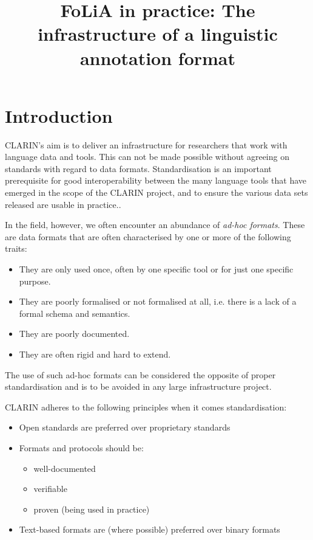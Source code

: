 \documentclass[a4paper,10pt,twoside]{article}
\begin{document}
\title{FoLiA in practice: The infrastructure of a linguistic annotation format}

\section{Introduction}

CLARIN's aim is to deliver an infrastructure for researchers that work with
language data and tools. This can not be made possible without agreeing on standards
with regard to data formats. Standardisation is an important prerequisite for
good interoperability between the many language tools that have emerged in the scope
of the CLARIN project, and to ensure the various data sets released are usable
in practice..

In the field, however, we often encounter an abundance of \emph{ad-hoc formats}. These are
data formats that are often characterised by one or more of the following traits:

\begin{itemize}
    \item They are only used once, often by one specific tool or for just one specific purpose.
    \item They are poorly formalised or not formalised at all, i.e. there is a lack of a formal schema and semantics.
    \item They are poorly documented.
    \item They are often rigid and hard to extend.
\end{itemize}

The use of such ad-hoc formats can be considered the opposite of proper
standardisation and is to be avoided in any large infrastructure project. 

CLARIN adheres to the following principles when it comes standardisation:

\begin{itemize}
    \item Open standards are preferred over proprietary standards
    \item Formats and protocols should be:
    \begin{itemize}
        \item well-documented
        \item verifiable
        \item proven (being used in practice)
    \end{itemize}
    \item Text-based formats are (where possible) preferred over binary formats
\end{itemize}
\end{document}
